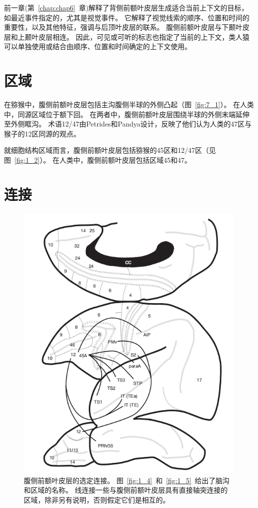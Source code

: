 前一章(第~\ref{chap:chap6}~章)解释了背侧前额叶皮层生成适合当前上下文的目标，如最近事件指定的，尤其是视觉事件。
它解释了视觉线索的顺序、位置和时间的重要性，以及其他特征，强调与后顶叶皮层的联系。
腹侧前额叶皮层与下颞叶皮层和上颞叶皮层相连。
因此，可见或可听的标志也指定了当前的上下文，类人猿可以单独使用或结合由顺序、位置和时间确定的上下文使用。



\section{区域}
\par
在猕猴中，腹侧前额叶皮层包括主沟腹侧半球的外侧凸起（图~\ref{fig:7_1}）。
在人类中，同源区域位于额下回。
在两者中，腹侧前额叶皮层围绕半球的外侧末端延伸至外侧眶沟。
术语12/47由Petrides和Pandya设计，反映了他们认为人类的47区与猴子的12区同源的观点\cite{petrides2002comparative}。
\par
就细胞结构区域而言，腹侧前额叶皮层包括猕猴的45区和12/47区（见图~\ref{fig:1_2}）。
在人类中，腹侧前额叶皮层包括区域45和47。


\section{连接}
\begin{figure}
	\centering
	\includegraphics[width=0.7\linewidth]{image_pfc/Fig_7_2}
	\caption{腹侧前额叶皮层的选定连接。
		图~\ref{fig:1_4}~和~\ref{fig:1_5}~给出了脑沟和区域的名称。
		线连接一些与腹侧前额叶皮层具有直接轴突连接的区域，除非另有说明，否则假定它们是相互的。\label{fig:7_2}}
\end{figure}


